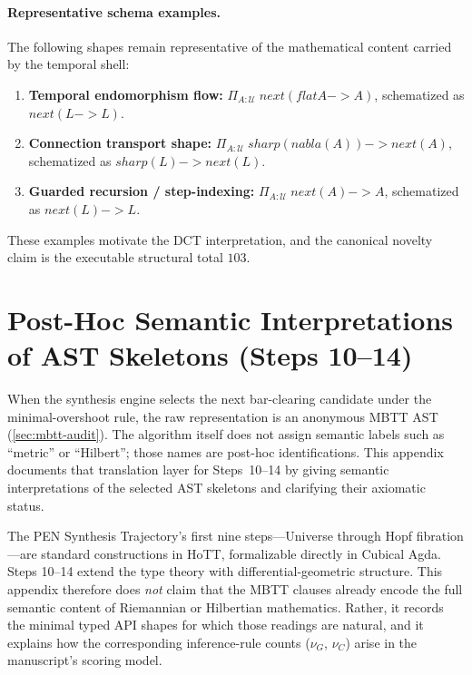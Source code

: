 \documentclass[11pt,a4paper]{article}
\def\to{->}%
\def\nabla{nabla}%
\def\flat{flat}%
\def\sharp{sharp}%
\def\bigcirc{next}%
\theoremstyle{plain}
\theoremstyle{definition}
\theoremstyle{remark}
\newcommand{\U}{\mathcal{U}}
\begin{document}
\paragraph{Representative schema examples.}
The following shapes remain representative of the mathematical content carried by the temporal shell:
\begin{enumerate}[nosep]
\item \textbf{Temporal endomorphism flow:} $\Pi_{A : \U}\; \bigcirc(\flat A \to A)$, schematized as $\bigcirc(L \to L)$.
\item \textbf{Connection transport shape:} $\Pi_{A : \U}\; \sharp(\nabla(A)) \to \bigcirc(A)$, schematized as $\sharp(L) \to \bigcirc(L)$.
\item \textbf{Guarded recursion / step-indexing:} $\Pi_{A : \U}\; \bigcirc(A) \to A$, schematized as $\bigcirc(L) \to L$.
\end{enumerate}
These examples motivate the DCT interpretation, and the canonical novelty claim is the executable structural total $103$.

\section{Post-Hoc Semantic Interpretations of AST Skeletons (Steps 10--14)}
\label{app:formal-specs}

When the synthesis engine selects the next bar-clearing candidate under the minimal-overshoot rule, the raw representation is an anonymous MBTT AST (\cref{sec:mbtt-audit}).
The algorithm itself does not assign semantic labels such as ``metric'' or ``Hilbert''; those names are post-hoc identifications.
This appendix documents that translation layer for Steps~10--14 by giving semantic interpretations of the selected AST skeletons and clarifying their axiomatic status.

The PEN Synthesis Trajectory's first nine steps---Universe through Hopf fibration---are standard constructions in HoTT, formalizable directly in Cubical Agda.
Steps 10--14 extend the type theory with differential-geometric structure.
This appendix therefore does \emph{not} claim that the MBTT clauses already encode the full semantic content of Riemannian or Hilbertian mathematics.
Rather, it records the minimal typed API shapes for which those readings are natural, and it explains how the corresponding inference-rule counts ($\nu_G$, $\nu_C$) arise in the manuscript's scoring model.
\end{document}
